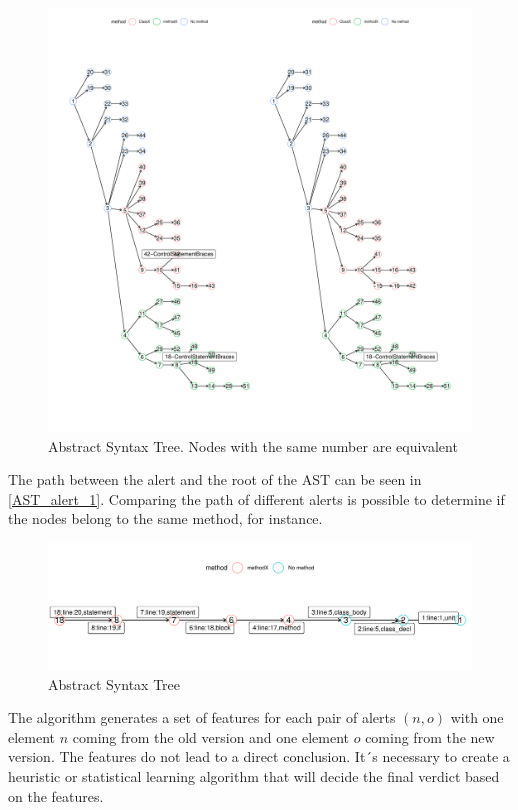 \documentclass[
]{article}
\begin{document}
\begin{figure}[H]
\includegraphics[width=.8\linewidth]{report_files/figure-latex/unnamed-chunk-3-1} \caption{Abstract Syntax Tree. Nodes with the same number are equivalent \label{AST_with_alerts}}\label{fig:unnamed-chunk-3}
\end{figure}

\normalsize

The path between the alert and the root of the AST can be seen in
\ref{AST_alert_1}. Comparing the path of different alerts is possible to
determine if the nodes belong to the same method, for instance.

\small

\begin{figure}[H]
\includegraphics[width=1\linewidth]{report_files/figure-latex/unnamed-chunk-4-1} \caption{Abstract Syntax Tree \label{AST_alert_1}}\label{fig:unnamed-chunk-4}
\end{figure}

\normalsize

The algorithm generates a set of features for each pair of alerts
\((n,o)\) with one element \(n\) coming from the old version and one
element \(o\) coming from the new version. The features do not lead to a
direct conclusion. It´s necessary to create a heuristic or statistical
learning algorithm that will decide the final verdict based on the
features.
\end{document}
